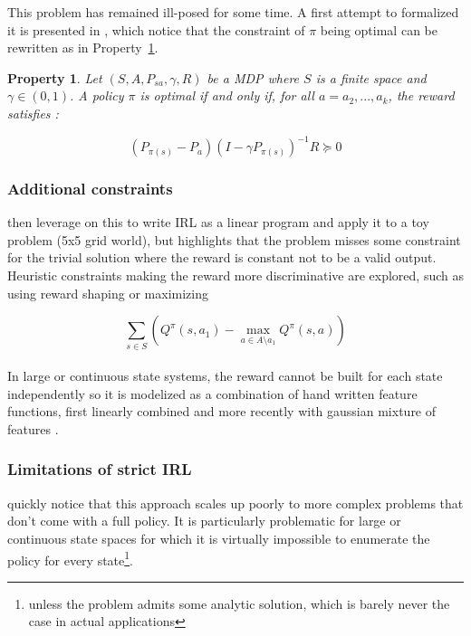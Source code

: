 \documentclass{article}
\newtheorem{property}{Property}
\begin{document}
This problem has remained ill-posed for some time. A first attempt to formalized it is presented in \cite{Ng00}, which notice that the constraint of $\pi$ being optimal can be rewritten as in Property~\ref{prop:irl}.

\begin{property}
\label{prop:irl}
Let  $(S,A,P_{sa},\gamma,R)$ be a MDP where $S$ is a finite space and $\gamma \in (0,1)$. A policy $\pi$ is optimal if and only if, for all $a=a_{2},...,a_{k}$, the reward satisfies :

\[
(P_{\pi(s)} - P_a)(I - \gamma P_{\pi(s)})^{-1} R \succeq 0
\]
\end{property}

\subsubsection{Additional constraints}

\cite{Ng00} then leverage on this to write IRL as a linear program and apply it to a toy problem (5x5 grid world), but highlights that the problem misses some constraint for the trivial solution where the reward is constant not to be a valid output. Heuristic constraints making the reward more discriminative are explored, such as using reward shaping \cite{Ng99} or maximizing

\[
\sum _{s \in S}\left(Q^\pi(s, a_1) - \max_{a \in A \setminus a_1} Q^\pi(s,a)\right)
\]

\paragraph{}
In large or continuous state systems, the reward cannot be built for each state independently so it is modelized as a combination of hand written feature functions, first linearly combined \cite{Abbeel04} and more recently with gaussian mixture of features \cite{Levine11}.

\subsubsection{Limitations of strict IRL}

\cite{Ng00} quickly notice that this approach scales up poorly to more complex problems that don't come with a full policy. It is particularly problematic for large or continuous state spaces for which it is virtually impossible to enumerate the policy for every state\footnote{unless the problem admits some analytic solution, which is barely never the case in actual applications}.
\end{document}
